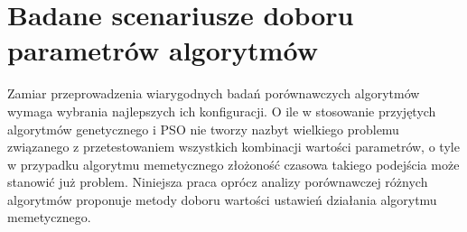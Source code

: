 \section{Badane scenariusze doboru parametrów algorytmów}
\par
Zamiar przeprowadzenia wiarygodnych badań porównawczych algorytmów wymaga wybrania najlepszych ich konfiguracji. O ile w stosowanie przyjętych algorytmów genetycznego i PSO nie tworzy nazbyt wielkiego problemu związanego z przetestowaniem wszystkich kombinacji wartości parametrów, o tyle w przypadku algorytmu memetycznego złożoność czasowa takiego podejścia może stanowić już problem. Niniejsza praca oprócz analizy porównawczej różnych algorytmów proponuje metody doboru wartości ustawień działania algorytmu memetycznego. 
